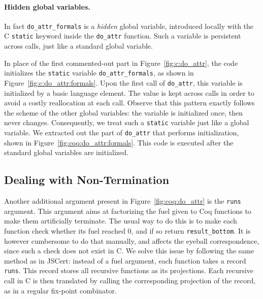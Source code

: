 \documentclass[
    sigplan,
    10pt,
    review, %
    natbib=false %
 ]{acmart}
\newcommand\mb[1]{\todo[color=purple!20,size=\scriptsize]{#1}}
\newcommand\et[1]{\todo[color=blue!20,size=\scriptsize]{#1}}
\begin{document}
\paragraph{Hidden global variables.} In fact \texttt{do_attr_formals} is a {\em hidden} global variable, introduced locally with the C \texttt{static} keyword inside the \texttt{do_attr} function. Such a variable is persistent across calls, just like a standard global variable.

In place of the first commented-out part in Figure~\ref{fig:c:do_attr}, the code initializes the \texttt{static} variable \texttt{do_attr_formals}, as shown in Figure~\ref{fig:c:do_attr:formals}.
Upon the first call of \texttt{do_attr}, this variable is initialized by a basic language element.
The value is kept across calls in order to avoid a costly reallocation at each call.
%
Observe that this pattern exactly follows the scheme of the other global variables:
the variable is initialized once, then never changes.
Consequently, we treat such a \texttt{static} variable just like a global variable.
We extracted out the part of \texttt{do_attr} that performs initialization, shown in Figure~\ref{fig:coq:do_attr:formals}.
This code is executed after the standard global variables are initialized.


\subsection{Dealing with Non-Termination}
\label{sec:fuel}
Another additional argument present in Figure~\ref{fig:coq:do_attr}
is the \texttt{runs} argument.
This argument aims at factorizing the fuel given to Coq functions
to make them artificially terminate.
The usual way to do this is to make each function check whether its fuel
reached \(0\), and if so return \texttt{result_bottom}.
It is however cumbersome to do that manually, and affects the eyeball correspondence, since such a check does not exist in C.
%
We solve this issue by following the same method as in JSCert:
instead of a fuel argument, each function takes a record \texttt{runs}.
This record stores all recursive functions as its projections.
Each recursive call in C is then translated by calling
the corresponding projection of the record,
as in a regular fix-point combinator.
\end{document}

